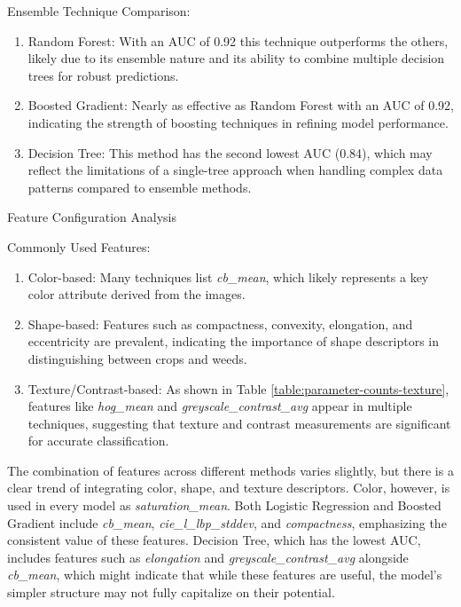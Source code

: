 \documentclass[letterpaper, notitlepage]{report}
\begin{document}
Ensemble Technique Comparison:
\begin{enumerate}
	\item{Random Forest: With an \gls{AUC} of 0.92 this technique outperforms the others, likely due to its ensemble nature and its ability to combine multiple decision trees for robust predictions.}
	\item{Boosted Gradient: Nearly as effective as Random Forest with an \gls{AUC} of 0.92, indicating the strength of boosting techniques in refining model performance.}
	\item{Decision Tree: This method has the second lowest \gls{AUC} (0.84), which may reflect the limitations of a single-tree approach when handling complex data patterns compared to ensemble methods.}
\end{enumerate}

Feature Configuration Analysis

Commonly Used Features:

\begin{enumerate}
	\item{Color-based: Many techniques list \textit{cb\_mean}, which likely represents a key color attribute derived from the images.}
	\item{Shape-based: Features such as compactness, convexity, elongation, and eccentricity are prevalent, indicating the importance of shape descriptors in distinguishing between crops and weeds.}
	\item{Texture/Contrast-based: As shown in Table \ref{table:parameter-counts-texture}, features like \textit{hog\_mean} and \textit{greyscale\_contrast\_avg} appear in multiple techniques, suggesting that texture and contrast measurements are significant for accurate classification.}
\end{enumerate}

{

}


The combination of features across different methods varies slightly, but there is a clear trend of integrating color, shape, and texture descriptors. Color, however, is used in every model as \textit{saturation\_mean}. Both Logistic Regression and Boosted Gradient include \textit{cb\_mean}, \textit{cie\_l\_lbp\_stddev}, and \textit{compactness}, emphasizing the consistent value of these features.
Decision Tree, which has the lowest AUC, includes features such as \textit{elongation} and \textit{greyscale\_contrast\_avg} alongside \textit{cb\_mean}, which might indicate that while these features are useful, the model’s simpler structure may not fully capitalize on their potential.
\end{document}
